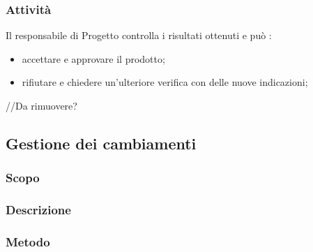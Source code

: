 \subsubsection{Attività}
Il responsabile di Progetto controlla i risultati ottenuti e può :
\begin{itemize}
\item accettare e approvare il prodotto;
\item rifiutare e chiedere un’ulteriore verifica con delle nuove indicazioni;
\end{itemize}


//Da rimuovere?
\subsection{Gestione dei cambiamenti}
\subsubsection{Scopo}
\subsubsection{Descrizione}
\subsubsection{Metodo}
